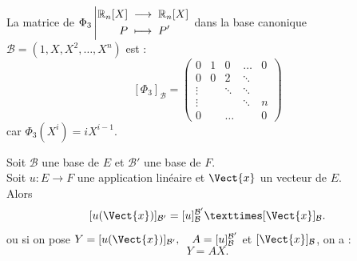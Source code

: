 \documentclass{book}
\begin{document}
\begin{Exemple} La matrice de ${\Phi _3}\left|\begin{aligned}{\mathbb {R}_n[X] }&\;\longrightarrow\;{\mathbb {R}_n[X]}\\{P}&\;\longmapsto\;{P'}\end{aligned}\right.$ dans la base canonique $\mathcal{B}=(1,X,X^2,\dots,X^n)$ est :
 $$[\Phi _3]_{\mathcal{B}}= \begin{pmatrix} 0 &1&0&\ldots &0 \\
 0& 0&2&\ddots \\
 \vdots &  &\ddots & \ddots \\
  \vdots &  & & \ddots& n\\
 0 &  & \dots& & 0
\end{pmatrix}   $$
car $\Phi _3(X^i)=i X^{i-1}$.
\end{Exemple}


\begin{Theoreme}
Soit $\mathcal{B}$ une base de $E$ et $\mathcal{B}'$ une base de $F$.\\
Soit $u:E\to F$ une application linéaire et $\Vect{x}$ un vecteur de $E$.\\
Alors \[ [u(\Vect{x})]_{\mathcal{B}'} = [u]_\mathcal{B}^{\mathcal{B}'} × [\Vect{x}]_\mathcal{B}. \]
ou si on pose $Y=[u(\Vect{x})]_{\mathcal{B}'},\quad A =[u]_\mathcal{B}^{\mathcal{B}'}$ et  $[\Vect{x}]_\mathcal{B}$, on a :
$$Y=AX.$$
\end{Theoreme}
\end{document}
